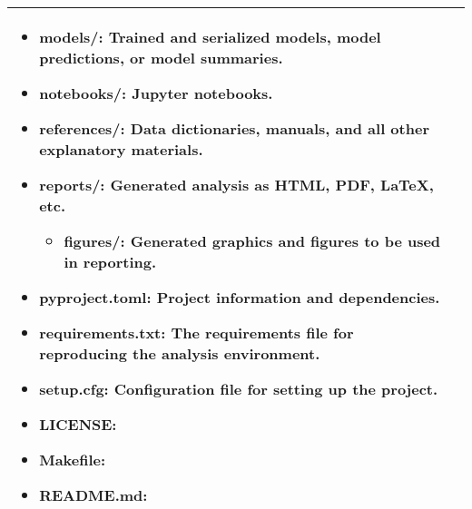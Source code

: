 \begin{summary}
\begin{center}
\begin{tabular}{ll}
{\begin{itemize}
\begin{itemize}
                    \item models/: Trained and serialized models, model predictions, or model summaries.
                    \item notebooks/: Jupyter notebooks.  
                    \item references/: Data dictionaries, manuals, and all other explanatory materials.
                    \item reports/: Generated analysis as HTML, PDF, LaTeX, etc.
                    \begin{itemize}
                        \item figures/: Generated graphics and figures to be used in reporting.
                    \end{itemize}
                    \item pyproject.toml: Project information and dependencies.
                    \item requirements.txt: The requirements file for reproducing the analysis environment.
                    \item setup.cfg: Configuration file for setting up the project.
                    \item LICENSE: 
                    \item Makefile: 
                    \item README.md: 
                \end{itemize}
            \end{itemize}} \\
            \bottomrule
        \end{tabular}
    \end{center}
\end{summary}
\newpage

